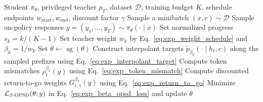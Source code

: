 \begin{algorithm}[t]
\caption{\ours: Smooth Target Distillation Toward Logit Interpolants}
\label{alg:slide}
\begin{algorithmic}[1]
\Require Student $\pi_\theta$, privileged teacher $p_T$, dataset $\mathcal{D}$,
training budget $K$, schedule endpoints $w_{\mathrm{start}},w_{\mathrm{end}}$,
discount factor $\gamma$
    \State Sample a minibatch $(x,c)\sim\mathcal{D}$
    \State Sample on-policy responses $y=(y_1,\ldots,y_T)\sim\pi_\theta(\cdot\mid x)$
    \State Set normalized progress $s_k=k/(K-1)$
    \State Set teacher weight $w_k$ by Eq.~\ref{eq:exp_weight_schedule} and $\beta_k=1/w_k$
    \State Set $\bar{\theta}\leftarrow \operatorname{sg}(\theta)$
    \State Construct interpolant targets $\tilde p_{\beta_k}(\cdot\mid h_t,c)$
    along the sampled prefixes using Eq.~\ref{eq:exp_interpolant_target}
    \State Compute token mismatches $\rho_t^{\beta_k}(y)$ using Eq.~\ref{eq:exp_token_mismatch}
    \State Compute discounted return-to-go weights $G_{t,\gamma}^{\beta_k}(y)$
    using Eq.~\ref{eq:exp_return_to_go}
    \State Minimize $\mathcal{L}_{\textsc{$\beta$-OPSD}}(\theta;y)$ in Eq.~\ref{eq:exp_beta_opsd_loss}
    and update $\theta$
\EndFor
\end{algorithmic}
\end{algorithm}